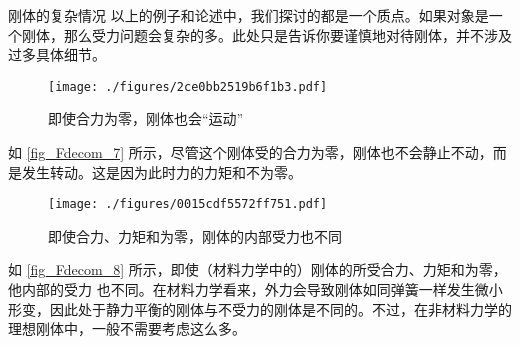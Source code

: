 \begin{example}{刚体的复杂情况}
以上的例子和论述中，我们探讨的都是一个质点。如果对象是一个刚体，那么受力问题会复杂的多。此处只是告诉你要谨慎地对待刚体，并不涉及过多具体细节。

\begin{figure}[ht]
\centering
\texttt{[image: ./figures/2ce0bb2519b6f1b3.pdf]}
\caption{即使合力为零，刚体也会“运动”} \label{fig_Fdecom_7}
\end{figure}
如 \autoref{fig_Fdecom_7} 所示，尽管这个刚体受的合力为零，刚体也不会静止不动，而是发生转动。这是因为此时力的力矩和不为零。

\begin{figure}[ht]
\centering
\texttt{[image: ./figures/0015cdf5572ff751.pdf]}
\caption{即使合力、力矩和为零，刚体的内部受力也不同} \label{fig_Fdecom_8}
\end{figure}
如 \autoref{fig_Fdecom_8}  所示，即使（材料力学中的）刚体的所受合力、力矩和为零，他内部的受力 也不同。在材料力学看来，外力会导致刚体如同弹簧一样发生微小形变，因此处于静力平衡的刚体与不受力的刚体是不同的。不过，在非材料力学的理想刚体中，一般不需要考虑这么多。
\end{example}
